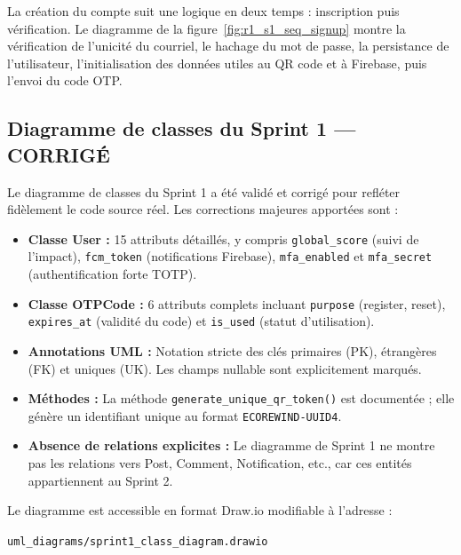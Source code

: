 \label{fig:r1_s1_seq_auth}

La création du compte suit une logique en deux temps : inscription puis vérification. Le diagramme de la figure~\ref{fig:r1_s1_seq_signup} montre la vérification de l'unicité du courriel, le hachage du mot de passe, la persistance de l'utilisateur, l'initialisation des données utiles au QR code et à Firebase, puis l'envoi du code OTP.

\label{fig:r1_s1_seq_signup}

\subsection{Diagramme de classes du Sprint 1 — CORRIGÉ}
\label{subsec:r1_s1_class_corrected}

Le diagramme de classes du Sprint 1 a été validé et corrigé pour refléter fidèlement le code source réel. Les corrections majeures apportées sont :

\begin{itemize}
    \item \textbf{Classe User :} 15 attributs détaillés, y compris \texttt{global\_score} (suivi de l'impact), \texttt{fcm\_token} (notifications Firebase), \texttt{mfa\_enabled} et \texttt{mfa\_secret} (authentification forte TOTP).
    \item \textbf{Classe OTPCode :} 6 attributs complets incluant \texttt{purpose} (register, reset), \texttt{expires\_at} (validité du code) et \texttt{is\_used} (statut d'utilisation).
    \item \textbf{Annotations UML :} Notation stricte des clés primaires (PK), étrangères (FK) et uniques (UK). Les champs nullable sont explicitement marqués.
    \item \textbf{Méthodes :} La méthode \texttt{generate\_unique\_qr\_token()} est documentée ; elle génère un identifiant unique au format \texttt{ECOREWIND-UUID4}.
    \item \textbf{Absence de relations explicites :} Le diagramme de Sprint 1 ne montre pas les relations vers Post, Comment, Notification, etc., car ces entités appartiennent au Sprint 2.
\end{itemize}

Le diagramme est accessible en format Draw.io modifiable à l'adresse :
\begin{center}
    \texttt{uml\_diagrams/sprint1\_class\_diagram.drawio}
\end{center}

